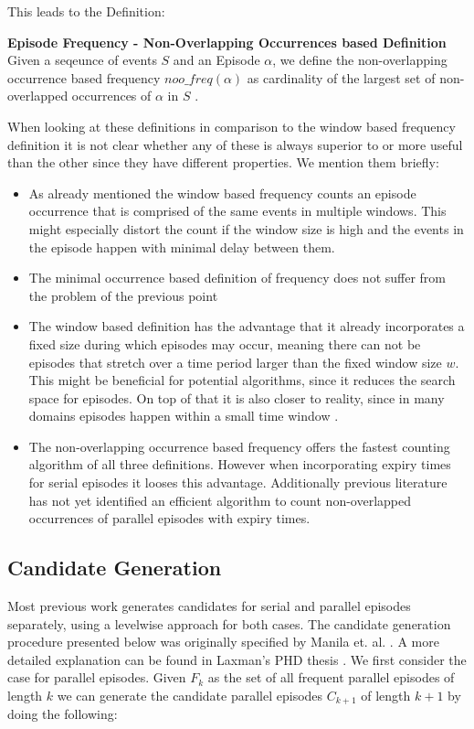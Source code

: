 This leads to the Definition:

\begin{mydef}
\textbf{Episode Frequency - Non-Overlapping Occurrences based Definition} Given a seqeunce of events $S$ and an Episode $\alpha$, we define the non-overlapping occurrence based frequency $noo\_freq(\alpha )$ as cardinality of the largest set of non-overlapped occurrences of $\alpha$ in $S$ \cite{laxman2007fast}.
\end{mydef}


When looking at these definitions in comparison to the window based frequency definition it is not clear whether any of these is always superior to or more useful than the other since they have different properties. We mention them briefly:

\begin{itemize}
	\item As already mentioned the window based frequency counts an episode occurrence that is comprised of the same events in multiple windows. This might especially distort the count if the window size is high and the events in the episode happen with minimal delay between them.
	\item The minimal occurrence based definition of frequency does not suffer from the problem of the previous point
	\item The window based definition has the advantage that it already incorporates a fixed size during which episodes may occur, meaning there can not be episodes that stretch over a time period larger than the fixed window size $w$. This might be beneficial for potential algorithms, since it reduces the search space for episodes. On top of that it is also closer to reality, since in many domains episodes happen within a small time window \cite{generatingEpisodeDatasets}.
	\item The non-overlapping occurrence based frequency offers the fastest counting algorithm of all three definitions. However when incorporating expiry times for serial episodes it looses this advantage. Additionally previous literature has not yet identified an efficient algorithm to count non-overlapped occurrences of parallel episodes with expiry times. 
\end{itemize}

\subsection{Candidate Generation}
\label{subsec_candidateGen}
Most previous work generates candidates for serial and parallel episodes separately, using a levelwise approach for both cases. The candidate generation procedure presented below was originally specified by Manila et. al. \cite{mannila1997discovery}. A more detailed explanation can be found in Laxman's PHD thesis \cite{laxman2006discovering}. \newline
We first consider the case for parallel episodes. Given $F_k$ as the set of all frequent parallel episodes of length $k$ we can generate the candidate parallel episodes $C_{k+1}$ of length $k+1$ by doing the following:

